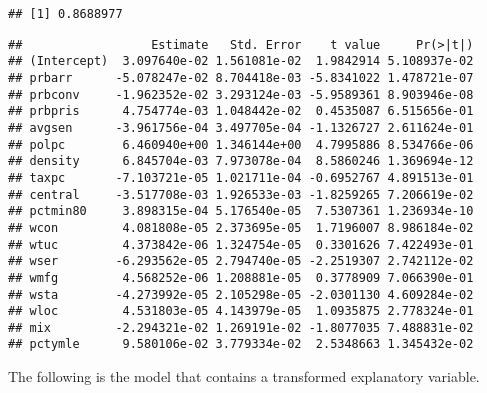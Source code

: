 \documentclass[]{article}
\newenvironment{Shaded}{\begin{snugshade}}{\end{snugshade}}
\newcommand{\KeywordTok}[1]{\textcolor[rgb]{0.13,0.29,0.53}{\textbf{#1}}}
\newcommand{\DataTypeTok}[1]{\textcolor[rgb]{0.13,0.29,0.53}{#1}}
\newcommand{\StringTok}[1]{\textcolor[rgb]{0.31,0.60,0.02}{#1}}
\newcommand{\OperatorTok}[1]{\textcolor[rgb]{0.81,0.36,0.00}{\textbf{#1}}}
\newcommand{\NormalTok}[1]{#1}
\begin{document}
\begin{verbatim}
## [1] 0.8688977
\end{verbatim}

\begin{Shaded}
\end{Shaded}

\begin{verbatim}
##                  Estimate   Std. Error    t value     Pr(>|t|)
## (Intercept)  3.097640e-02 1.561081e-02  1.9842914 5.108937e-02
## prbarr      -5.078247e-02 8.704418e-03 -5.8341022 1.478721e-07
## prbconv     -1.962352e-02 3.293124e-03 -5.9589361 8.903946e-08
## prbpris      4.754774e-03 1.048442e-02  0.4535087 6.515656e-01
## avgsen      -3.961756e-04 3.497705e-04 -1.1326727 2.611624e-01
## polpc        6.460940e+00 1.346144e+00  4.7995886 8.534766e-06
## density      6.845704e-03 7.973078e-04  8.5860246 1.369694e-12
## taxpc       -7.103721e-05 1.021711e-04 -0.6952767 4.891513e-01
## central     -3.517708e-03 1.926533e-03 -1.8259265 7.206619e-02
## pctmin80     3.898315e-04 5.176540e-05  7.5307361 1.236934e-10
## wcon         4.081808e-05 2.373695e-05  1.7196007 8.986184e-02
## wtuc         4.373842e-06 1.324754e-05  0.3301626 7.422493e-01
## wser        -6.293562e-05 2.794740e-05 -2.2519307 2.742112e-02
## wmfg         4.568252e-06 1.208881e-05  0.3778909 7.066390e-01
## wsta        -4.273992e-05 2.105298e-05 -2.0301130 4.609284e-02
## wloc         4.531803e-05 4.143979e-05  1.0935875 2.778324e-01
## mix         -2.294321e-02 1.269191e-02 -1.8077035 7.488831e-02
## pctymle      9.580106e-02 3.779334e-02  2.5348663 1.345432e-02
\end{verbatim}

The following is the model that contains a transformed explanatory
variable.

\begin{Shaded}
\end{Shaded}
\end{document}
